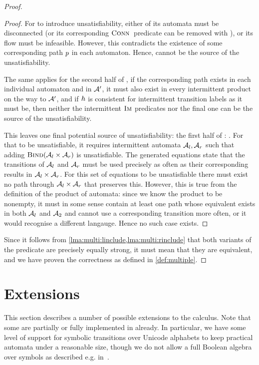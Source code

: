 \documentclass[acmsmall,review,anonymous,screen]{acmart}\settopmatter{printfolios=true,printccs=true,printacmref=true}
\theoremstyle{definition}
\begin{document}
\begin{proof}
\begin{proof}
  For \ExpandM{} to introduce unsatisfiability, either of its automata must be
  disconnected (or its corresponding $\operatorname{\textsc{Conn}}{}$ predicate can be removed
  with \Propagate{}), or its flow must be infeasible. However, this contradicts
  the existence of some corresponding path $p$ in each automaton. Hence,
  \ExpandM{} cannot be the source of the unsatisfiability.

  The same applies for the second half of \Materialise{}, if the corresponding
  path exists in each individual automaton and in $\mathcal{A}'$, it must also
  exist in every intermittent product on the way to $\mathcal{A}'$, and if $h$
  is consistent for intermittent transition labels as it must be, then neither the intermittent $\operatorname{\textsc{Im}}$ predicates nor the final one can be the source of the unsatisfiability.

  This leaves one final potential source of unsatisfiability: the first half of
  \Materialise{}: \BindingSum{}. For that to be unsatisfiable, it requires
  intermittent automata $\mathcal{A}_l, \mathcal{A}_r$ such that adding
  $\textsc{Bind}(\mathcal{A}_l \times \mathcal{A}_r)$ is unsatisfiable. The
  generated equations state that the transitions of $\mathcal{A}_l$ and
  $\mathcal{A}_r$ must be used precisely as often as their corresponding results
  in $\mathcal{A}_l \times \mathcal{A}_r$. For this set of equations to be
  unsatisfiable there must exist no path through $\mathcal{A}_l \times
  \mathcal{A}_r$ that preserves this. However, this is true from the definition
  of the product of automata: since we know the product to be nonempty, it must
  in some sense contain at least one path whose equivalent exists in both
  $\mathcal{A}_l$ and $\mathcal{A}_2$ and cannot use a corresponding transition
  more often, or it would recognise a different langauge. Hence no such case
  exists.
\end{proof}

Since it follows from \cref{lma:multi:linclude,lma:multi:rinclude} that both
variants of the predicate are precisely equally strong, it must mean that they
are equivalent, and we have proven the correctness as defined in
\cref{def:multiple}.
\end{proof}


\section{Extensions}\label{sec:extensions}

This section describes a number of possible extensions to the calculus. Note
that some are partially or fully implemented in \Catra{} already. In particular,
we have some level of support for symbolic transitions over Unicode alphabets to
keep practical automata under a reasonable size, though we do not allow a full Boolean algebra over symbols as described e.g. in~\cite{symbolic-automata}.
\end{document}
